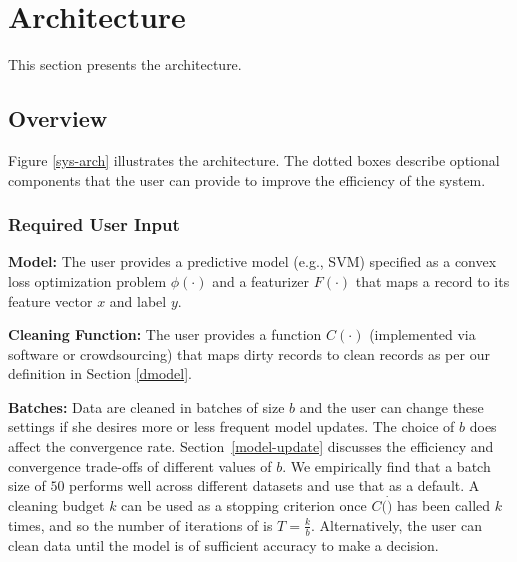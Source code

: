 \section{Architecture}\label{arch}
\noindent This section presents the \sys architecture.

\subsection{Overview}\label{sysover}
Figure \ref{sys-arch} illustrates the \sys architecture.
The dotted boxes describe optional components that the user can provide to improve the efficiency of the system.  

\subsubsection{Required User Input}\label{uinp}

\noindent\textbf{Model:} The user provides a predictive model (e.g., SVM) specified as a convex loss optimization problem $\phi(\cdot)$ and a featurizer $F(\cdot)$ that maps a record to its feature vector $x$ and label $y$.

\vspace{0.25em}

\noindent\textbf{Cleaning Function: } The user provides a function $C(\cdot)$ (implemented via software or crowdsourcing) that maps dirty records to clean records as per our definition in Section \ref{dmodel}. 

\vspace{0.25em}

\noindent\textbf{Batches: } Data are cleaned in batches of size $b$ and the user can change these settings if she desires more or less frequent model updates.
The choice of $b$ does affect the convergence rate.
Section~\ref{model-update} discusses the efficiency and convergence trade-offs of different values of $b$.
We empirically find that a batch size of $50$ performs well across different datasets and use that as a default.
A cleaning budget $k$ can be used as a stopping criterion once $C(\dot)$ has been called $k$ times, and so the number of iterations of \sys is $T = \frac{k}{b}$.
Alternatively, the user can clean data until the model is of sufficient accuracy to make a decision.


